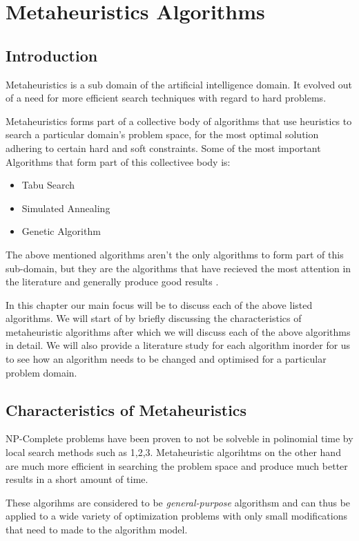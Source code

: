 \chapter{Metaheuristics Algorithms}

\section{Introduction}
Metaheuristics is a sub domain of the artificial intelligence domain. It evolved out of a need for more efficient search techniques with regard to hard problems. 

Metaheuristics forms part of a collective body of algorithms that use heuristics to search a particular domain's problem space, for the most optimal solution adhering to certain hard and soft constraints. Some of the most important Algorithms that form part of this collectivee body is:
\begin{itemize}
\item Tabu Search
\item Simulated Annealing
\item Genetic Algorithm
\end{itemize}
The above mentioned algorithms aren't the only algorithms to form part of this sub-domain, but they are the algorithms that have recieved the most attention in the literature and generally produce good results \cite{SweepMeta}.

In this chapter our main focus will be to discuss each of the above listed algorithms. We will start of by briefly discussing the characteristics of metaheuristic algorithms after which we will discuss each of the above algorithms in detail. We will also provide a literature study for each algorithm inorder for us to see how an algorithm needs to be changed and optimised for a particular problem domain. 

\section{Characteristics of Metaheuristics}
NP-Complete problems have been proven to not be solveble in polinomial time by local search methods such as 1,2,3. Metaheuristic algorihtms on the other hand are much more efficient in searching the problem space and produce much better results in a short amount of time. 

These algorihms are considered to be \emph{general-purpose} algorithsm and can thus be applied to a wide variety of optimization problems with only small modifications that need to made to the algorithm model\cite{MetaGraph}.

